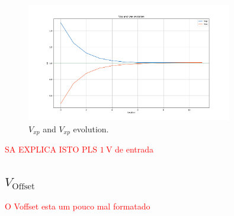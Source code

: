 \begin{figure}[H]

    \centering
    \includegraphics*[width=0.8\textwidth]{Images/Vxp_Vxn_evolution_1V_input.png}
    \caption{$V_{xp}$ and $V_{xp}$ evolution.}

    \label{fig:VxpVxnEvo}
\end{figure}
\textcolor{red}{SA EXPLICA ISTO PLS $\SI{1}{\volt}$ de entrada }

\subsection{ $V_{\text{Offset}}$ }


\textcolor{red}{O Voffset esta um pouco mal formatado}

